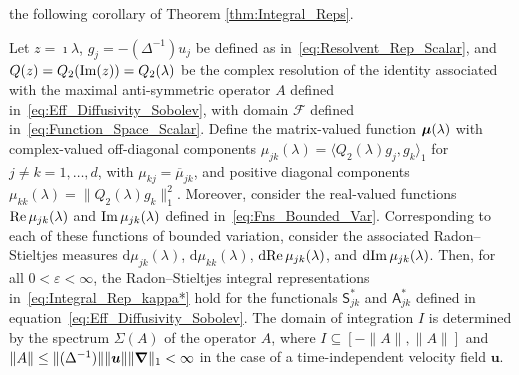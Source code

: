 \documentclass[leqno,onefignum,onetabnum]{siamltex1213}
\renewcommand{\d}{\mathrm{d}}
\newcommand{\Sm}{\mathsf{S}}
\newcommand{\Am}{\mathsf{A}}
\newcommand{\Fs}{\mathscr{F}}
\newcommand\bmu{\mbox{\boldmath${\mu}$}}
\newcommand\bnabla{\mbox{\boldmath${\nabla}$}}
\newcommand{\vecu}{\boldsymbol{u}}
\begin{document}
the following corollary of Theorem \ref{thm:Integral_Reps}.
%
\begin{corollary}\label{cor:Integral_Reps}
%
Let $z=\imath\lambda$, $g_j=-(\Delta^{-1})u_j$ be defined as
in~\eqref{eq:Resolvent_Rep_Scalar}, and $Q(z)=Q_2({\rm Im}(z))=Q_2(\lambda)$
be 
the complex resolution of the identity associated with the maximal
anti-symmetric operator $A$ defined
in~\eqref{eq:Eff_Diffusivity_Sobolev}, with domain $\Fs$ defined
in~\eqref{eq:Function_Space_Scalar}.  Define the matrix-valued
function 
$\bmu(\lambda)$ with complex-valued off-diagonal components
$\mu_{jk}(\lambda)=\langle Q_2(\lambda)g_j,g_k\rangle_1$ for $j\neq k=1,\ldots,d$, with
$\mu_{kj}=\overline{\mu}_{jk}$, and positive diagonal components
$\mu_{kk}(\lambda)=\|Q_2(\lambda)g_k\|_1^2$.  Moreover, consider the real-valued
functions ${\rm Re}\,\mu_{jk}(\lambda)$ and ${\rm Im}\,\mu_{jk}(\lambda)$ defined
in~\eqref{eq:Fns_Bounded_Var}. Corresponding to each of these
functions 
of bounded variation, consider the associated Radon--Stieltjes
measures $\d\mu_{jk}(\lambda)$, $\d\mu_{kk}(\lambda)$, $\d{\rm Re}\,\mu_{jk}(\lambda)$, and
$\d{\rm Im}\,\mu_{jk}(\lambda)$. Then, for all $0<\varepsilon<\infty$, the Radon--Stieltjes
integral representations in~\eqref{eq:Integral_Rep_kappa*} hold for
the functionals $\Sm^*_{jk}$ and $\Am^*_{jk}$ defined in
equation~\eqref{eq:Eff_Diffusivity_Sobolev}. The domain of integration
$I$ is 
determined by the spectrum $\Sigma(A)$ of the operator $A$, where
$I\subseteq[-\|A\|,\|A\|]$ and $\|A\|\leq\|(\Delta^{-1})\|\|\vecu \|\|\bnabla \|_1<\infty$ in the case
of a time-independent velocity field $\vecu $.
% 
\end{corollary}
%
\end{document}
